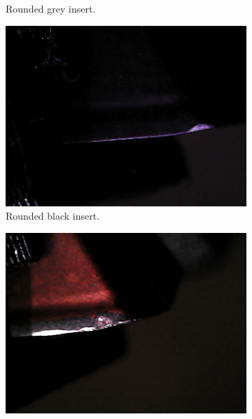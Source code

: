 \begin{figure}[hbtp]
\begin{subfigure}{0.31\textwidth}
		\caption{Rounded grey insert.}
		\label{fig:impl:datasets:spaghetti:roundedgrey}
	\end{subfigure}
	\hspace*{\fill}
	\begin{subfigure}{0.31\textwidth}
		\includegraphics[width=\linewidth, keepaspectratio=true]{./fig/Vision/Dataset/automated_datasets/2_created_datasets/2_Spaghetti_dataset/rounded_black_b_013_p_002_l_006-011_white_nb.png}
		\caption{Rounded black insert.}
		\label{fig:impl:datasets:spaghetti:roundedblack}
	\end{subfigure}
	\hspace*{\fill}
	\begin{subfigure}{0.31\textwidth}
		\includegraphics[width=\linewidth, keepaspectratio=true]{./fig/Vision/Dataset/automated_datasets/2_created_datasets/2_Spaghetti_dataset/rounded_copper_b_014_p_005_l_006-011_white_nb.png}

\end{subfigure}
\end{figure}
